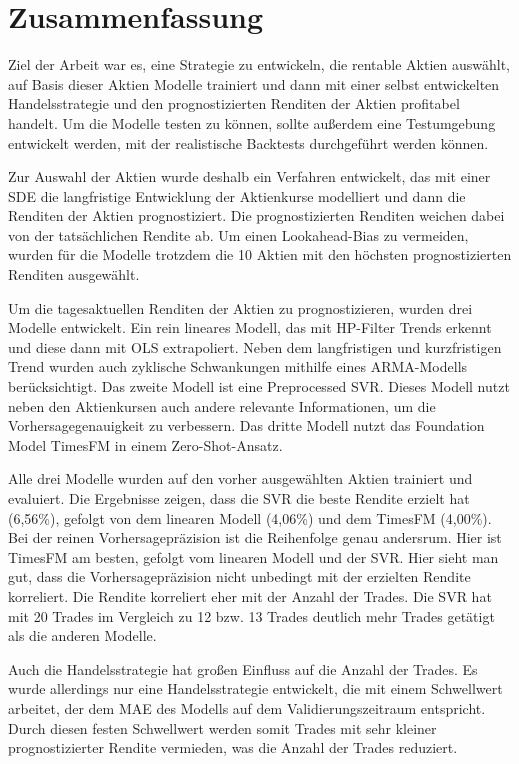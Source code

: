 \chapter{Zusammenfassung}\label{chap:zusammenfassung}
Ziel der Arbeit war es, eine Strategie zu entwickeln, die rentable Aktien auswählt, auf Basis dieser Aktien Modelle trainiert und dann mit einer selbst entwickelten Handelsstrategie und den prognostizierten Renditen der Aktien profitabel handelt. Um die Modelle testen zu können, sollte außerdem eine Testumgebung entwickelt werden, mit der realistische Backtests durchgeführt werden können.

Zur Auswahl der Aktien wurde deshalb ein Verfahren entwickelt, das mit einer SDE die langfristige Entwicklung der Aktienkurse modelliert und dann die Renditen der Aktien prognostiziert. Die prognostizierten Renditen weichen dabei von der tatsächlichen Rendite ab. Um einen Lookahead-Bias zu vermeiden, wurden für die Modelle trotzdem die 10 Aktien mit den höchsten prognostizierten Renditen ausgewählt.

Um die tagesaktuellen Renditen der Aktien zu prognostizieren, wurden drei Modelle entwickelt. Ein rein lineares Modell, das mit \ac{HP}-Filter Trends erkennt und diese dann mit \ac{OLS} extrapoliert. Neben dem langfristigen und kurzfristigen Trend wurden auch zyklische Schwankungen mithilfe eines \ac{ARMA}-Modells berücksichtigt. Das zweite Modell ist eine Preprocessed SVR. Dieses Modell nutzt neben den Aktienkursen auch andere relevante Informationen, um die Vorhersagegenauigkeit zu verbessern. Das dritte Modell nutzt das Foundation Model TimesFM in einem Zero-Shot-Ansatz.

Alle drei Modelle wurden auf den vorher ausgewählten Aktien trainiert und evaluiert. Die Ergebnisse zeigen, dass die SVR die beste Rendite erzielt hat (6,56\%), gefolgt von dem linearen Modell (4,06\%) und dem TimesFM (4,00\%). Bei der reinen Vorhersagepräzision ist die Reihenfolge genau andersrum. Hier ist TimesFM am besten, gefolgt vom linearen Modell und der SVR. Hier sieht man gut, dass die Vorhersagepräzision nicht unbedingt mit der erzielten Rendite korreliert. Die Rendite korreliert eher mit der Anzahl der Trades. Die SVR hat mit 20 Trades im Vergleich zu 12 bzw. 13 Trades deutlich mehr Trades getätigt als die anderen Modelle.

Auch die Handelsstrategie hat großen Einfluss auf die Anzahl der Trades. Es wurde allerdings nur eine Handelsstrategie entwickelt, die mit einem Schwellwert arbeitet, der dem \ac{MAE} des Modells auf dem Validierungszeitraum entspricht. Durch diesen festen Schwellwert werden somit Trades mit sehr kleiner prognostizierter Rendite vermieden, was die Anzahl der Trades reduziert.

